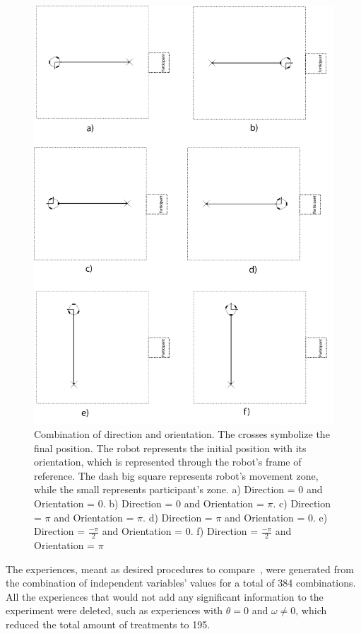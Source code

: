 \begin{figure}
	\centering
	\includegraphics[width=1.0\textwidth]{./Images/possibilities_case.png} 
	\caption{Combination of direction and orientation. The crosses symbolize the final position. The robot represents the initial position with its orientation, which is represented through the robot's frame of reference. The dash big square represents robot's movement zone, while the small represents participant's zone. a) Direction = $0$ and Orientation = $0$. b) Direction = $0$ and Orientation = $\pi$. c) Direction = $\pi$ and Orientation = $\pi$. d) Direction = $\pi$ and Orientation = $0$. e) Direction = $\frac{-\pi}{2}$ and Orientation = $0$. f) Direction = $\frac{-\pi}{2}$ and Orientation = $\pi$}
	\label{fig:possibilities_orientation_direction}
\end{figure}

The experiences, meant as desired procedures to compare~\cite{oehlert2000first}, were generated from the combination of independent variables' values for a total of 384 combinations. All the experiences that would not add any significant information to the experiment were deleted, such as experiences with $\theta=0$ and $\omega \neq 0$, which reduced the total amount of treatments to 195.

